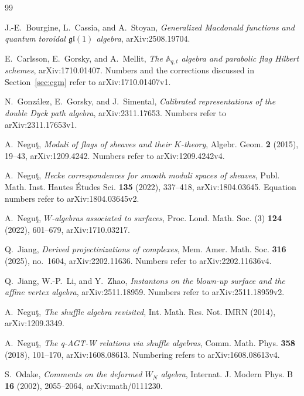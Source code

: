 \documentclass[11pt]{amsart}
\theoremstyle{definition}
\theoremstyle{remark}
\begin{document}
{\small
\begin{thebibliography}{99}

J.-E.~Bourgine, L.~Cassia, and A.~Stoyan,
\emph{Generalized Macdonald functions and quantum toroidal
\(\mathfrak{gl}(1)\) algebra},
arXiv:2508.19704.

E.~Carlsson, E.~Gorsky, and A.~Mellit,
\emph{The \(\mathbb A_{q,t}\) algebra and parabolic flag Hilbert schemes},
arXiv:1710.01407. Numbers and the corrections discussed in
Section~\ref{sec:cgm} refer to arXiv:1710.01407v1.

N.~Gonz\'alez, E.~Gorsky, and J.~Simental,
\emph{Calibrated representations of the double Dyck path algebra},
arXiv:2311.17653. Numbers refer to arXiv:2311.17653v1.

A.~Negu\c{t},
\emph{Moduli of flags of sheaves and their \(K\)-theory},
Algebr. Geom. \textbf{2} (2015), 19--43,
arXiv:1209.4242. Numbers refer to arXiv:1209.4242v4.

A.~Negu\c{t},
\emph{Hecke correspondences for smooth moduli spaces of sheaves},
Publ. Math. Inst. Hautes \'Etudes Sci. \textbf{135} (2022), 337--418,
arXiv:1804.03645. Equation numbers refer to arXiv:1804.03645v2.

A.~Negu\c{t},
\emph{\(W\)-algebras associated to surfaces},
Proc. Lond. Math. Soc. (3) \textbf{124} (2022), 601--679,
arXiv:1710.03217.

Q.~Jiang,
\emph{Derived projectivizations of complexes},
Mem. Amer. Math. Soc. \textbf{316} (2025), no.~1604,
arXiv:2202.11636. Numbers refer to arXiv:2202.11636v4.

Q.~Jiang, W.-P.~Li, and Y.~Zhao,
\emph{Instantons on the blown-up surface and the affine vertex algebra},
arXiv:2511.18959. Numbers refer to arXiv:2511.18959v2.

A.~Negu\c{t},
\emph{The shuffle algebra revisited},
Int. Math. Res. Not. IMRN (2014),
arXiv:1209.3349.

A.~Negu\c{t},
\emph{The q-AGT-W relations via shuffle algebras},
Comm. Math. Phys. \textbf{358} (2018), 101--170,
arXiv:1608.08613. Numbering refers to arXiv:1608.08613v4.

S.~Odake,
\emph{Comments on the deformed \(W_N\) algebra},
Internat. J. Modern Phys. B \textbf{16} (2002), 2055--2064,
arXiv:math/0111230.


\end{thebibliography}}
\end{document}
